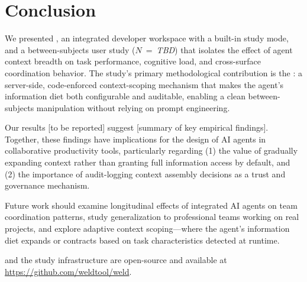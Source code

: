 \section{Conclusion}
\label{sec:conclusion}

We presented \Weld, an integrated developer workspace with a built-in study
mode, and a between-subjects user study ($N$~=~\emph{TBD}) that isolates the
effect of agent context breadth on task performance, cognitive load, and
cross-surface coordination behavior. The study's primary methodological
contribution is the \ContextGate: a server-side, code-enforced context-scoping
mechanism that makes the agent's information diet both configurable and
auditable, enabling a clean between-subjects manipulation without relying on
prompt engineering.


Our results [to be reported] suggest [summary of key empirical findings].
Together, these findings have implications for the design of AI agents in
collaborative productivity tools, particularly regarding (1) the value of
gradually expanding context rather than granting full information access by
default, and (2) the importance of audit-logging context assembly decisions as a
trust and governance mechanism.

Future work should examine longitudinal effects of integrated AI agents on team
coordination patterns, study generalization to professional teams working on
real projects, and explore adaptive context scoping---where the agent's
information diet expands or contracts based on task characteristics detected at
runtime.

\Weld and the study infrastructure are open-source and available at
\url{https://github.com/weldtool/weld}.
